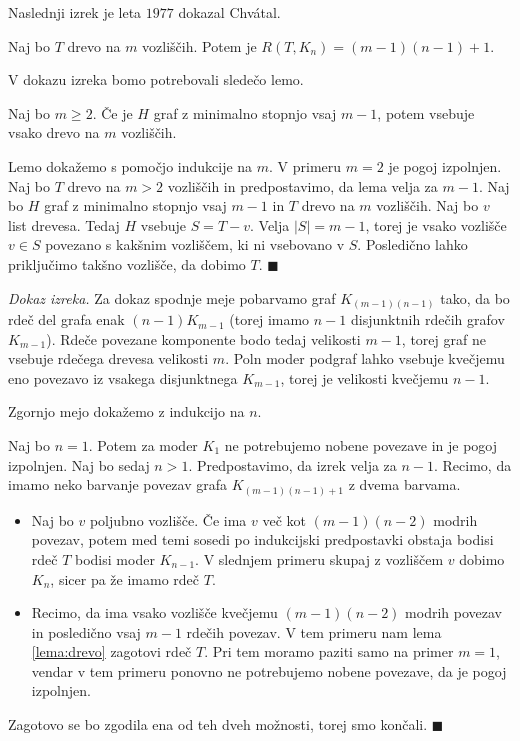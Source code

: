 \documentclass[twoside,11pt]{article}
\providecommand{\abs}[1]{\left\lvert #1\right\rvert}
\begin{document}
Naslednji izrek je leta $1977$ dokazal Chvátal.

\begin{izrek}[Chvátal]
    Naj bo $T$ drevo na $m$ vozliščih. Potem je $R(T, K_n) = (m-1)(n-1)+1$.    
\end{izrek}

V dokazu izreka bomo potrebovali sledečo lemo.

\begin{lema}
    Naj bo $m \ge 2$. Če je $H$ graf z minimalno stopnjo vsaj $m-1$, potem vsebuje vsako drevo na $m$ vozliščih.
    \label{lema:drevo}
\end{lema}
\begin{dokaz}
    Lemo dokažemo s pomočjo indukcije na $m$. V primeru $m=2$ je pogoj izpolnjen. Naj bo 
    $T$ drevo na $m > 2$ vozliščih in predpostavimo, da lema velja za $m-1$. Naj bo $H$ 
    graf z minimalno stopnjo vsaj $m-1$ in $T$ drevo na $m$ vozliščih. Naj bo $v$ list drevesa. 
    Tedaj $H$ vsebuje $S = T - v$. Velja $\abs{S} = {m-1}$, torej je vsako vozlišče 
    $v \in S$ povezano s kakšnim vozliščem, ki ni vsebovano v $S$. Posledično lahko 
    priključimo takšno vozlišče, da dobimo $T$. \hfill $\blacksquare$
\end{dokaz}

\noindent\textit{Dokaz izreka.}
    Za dokaz spodnje meje pobarvamo graf $K_{(m-1)(n-1)}$ tako, da bo rdeč del grafa enak 
    $(n-1)K_{m-1}$ (torej imamo $n-1$ disjunktnih rdečih grafov $K_{m-1}$). Rdeče povezane komponente 
    bodo tedaj velikosti $m-1$, torej graf ne vsebuje rdečega drevesa velikosti $m$. Poln moder 
    podgraf lahko vsebuje kvečjemu eno povezavo iz vsakega disjunktnega $K_{m-1}$, torej je 
    velikosti kvečjemu $n-1$.

    Zgornjo mejo dokažemo z indukcijo na $n$.
    
    Naj bo $n = 1$. Potem za moder $K_1$ ne potrebujemo nobene povezave in je pogoj izpolnjen. 
    Naj bo sedaj $n > 1$. Predpostavimo, da izrek velja za $n - 1$. Recimo, da imamo neko barvanje povezav grafa $K_{(m-1)(n-1)+1}$ z dvema barvama. 
    \begin{itemize}
        \item Naj bo $v$ poljubno vozlišče. Če ima $v$ več kot $(m-1)(n-2)$ modrih povezav, potem med temi sosedi 
        po indukcijski predpostavki obstaja bodisi rdeč $T$ bodisi moder $K_{n-1}$. V slednjem 
        primeru skupaj z vozliščem $v$ dobimo $K_n$, sicer pa že imamo rdeč $T$.
        \item Recimo, da ima vsako vozlišče kvečjemu $(m-1)(n-2)$ modrih povezav in posledično 
        vsaj $m-1$ rdečih povezav. V tem primeru nam lema \ref{lema:drevo} zagotovi rdeč $T$. Pri tem 
        moramo paziti samo na primer $m = 1$, vendar v tem primeru ponovno ne potrebujemo 
        nobene povezave, da je pogoj izpolnjen.
    \end{itemize}
    Zagotovo se bo zgodila ena od teh dveh možnosti, torej smo končali.  \hfill $\blacksquare$
\end{document}
